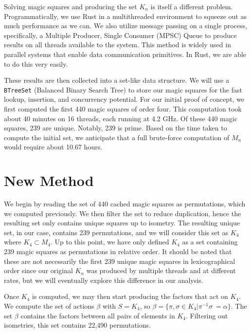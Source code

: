 \documentclass[12pt]{report}
\begin{document}
\par Solving magic squares and producing the set $K_n$ is itself a different problem.
Programmatically, we use Rust in a multithreaded environment to squeeze out as much performance as
we can. We also utilize message passing on a single process, specifically, a Multiple Producer,
Single Consumer (MPSC) Queue to produce results on all threads available to the system. This method
is widely used in parallel systems that enable data communication primitives. In Rust, we are able
to do this very easily.

\par These results are then collected into a set-like data structure. We will use a
\texttt{BTreeSet} (Balanced Binary Search Tree) to store our magic squares for the fast lookup,
insertion, and concurrency potential. For our initial proof of concept, we first computed the first
440 magic squares of order four. This computation took about 40 minutes on 16 threads, each running
at 4.2 GHz. Of these 440 magic squares, 239 are unique. Notably, 239 is prime. Based on the time
taken to compute the initial set, we anticipate that a full brute-force computation of $M_n$ would
require about 10.67 hours.

\section{New Method}

\par We begin by reading the set of 440 cached magic squares as permutations, which we computed
previously. We then filter the set to reduce duplication, hence the resulting set only contains
unique squares up to isometry. The resulting unique set, in our case, contains 239 permutations,
and we will consider this set as $K_4$ where $K_4\subset M_4$. Up to this point, we have only
defined $K_4$ as a set containing 239 magic squares as permutations in relative order. It should be
noted that these are not necessarily the first 239 unique magic squares in lexicographical order
since our original $K_n$ was produced by multiple threads and at different rates, but we will
eventually explore this difference in our analysis.

\par Once $K_4$ is computed, we may then start producing the factors that act on $K_4$. We compute
the set of actions $\beta$ with $S = K_4$, so  $\beta = \{\pi,\sigma\in K_4| \pi^{-1}\sigma\ =
  \alpha\}$. The set $\beta$ contains the factors between all pairs of elements in $K_4$. Filtering
out isometries, this set contains 22,490 permutations.
\end{document}
